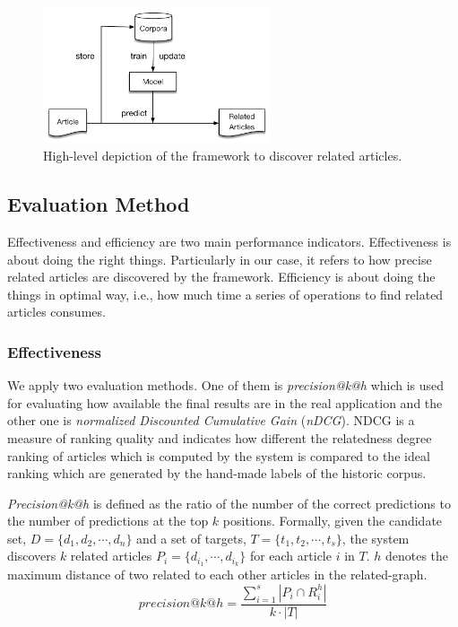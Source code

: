 \begin{figure}[!htb]
    \centering
    \includegraphics[width=0.6\textwidth]{fig/high-level.pdf}
    \caption{High-level depiction of the framework to discover related articles. }
    \label{fig:highlevel}
\end{figure}
\bigbreak
\subsection{Evaluation Method}
\label{sec:3.3}

Effectiveness and efficiency are two main performance indicators. Effectiveness is about doing the right things. Particularly in our case, it refers to how precise related articles are discovered by the framework. Efficiency is about doing the things in optimal way, i.e., how much time a series of operations to find related articles consumes. 

\subsubsection{Effectiveness}

We apply two evaluation methods. One of them is \textit{precision@k@h} which is used for evaluating how available the final results are in the real application and the other one is \textit{normalized Discounted Cumulative Gain} (\textit{nDCG}). NDCG is a measure of ranking quality and indicates how different the relatedness degree ranking of articles which is computed by the system is compared to the ideal ranking which are generated by the hand-made labels of the historic corpus. 

\textit{Precision@k@h} is defined as the ratio of the number of the correct predictions to the number of predictions at the top $k$ positions. Formally, given the candidate set, $D = \{d_1, d_2, \cdots, d_n\}$ and a set of targets, $T = \{t_1, t_2, \cdots, t_s\}$, the system discovers $k$ related articles $P_i = \{d_{i_1}, \cdots, d_{i_k}\}$ for each article $i$ in $T$. $h$ denotes the maximum distance of two related to each other articles in the related-graph. 
\begin{equation}
    precision@k@h = \frac{\sum_{i=1}^s{|P_i \cap R_i^h|}}{k \cdot |T|}
\end{equation}

